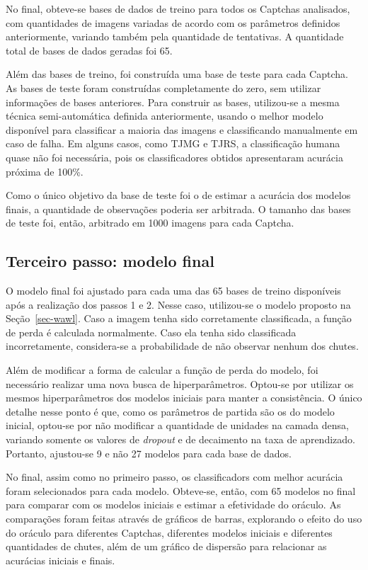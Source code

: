 \documentclass[12pt,twoside,brazilian]{book}
\begin{document}
No final, obteve-se bases de dados de treino para todos os Captchas
analisados, com quantidades de imagens variadas de acordo com os
parâmetros definidos anteriormente, variando também pela quantidade de
tentativas. A quantidade total de bases de dados geradas foi 65.

Além das bases de treino, foi construída uma base de teste para cada
Captcha. As bases de teste foram construídas completamente do zero, sem
utilizar informações de bases anteriores. Para construir as bases,
utilizou-se a mesma técnica semi-automática definida anteriormente,
usando o melhor modelo disponível para classificar a maioria das imagens
e classificando manualmente em caso de falha. Em alguns casos, como TJMG
e TJRS, a classificação humana quase não foi necessária, pois os
classificadores obtidos apresentaram acurácia próxima de 100\%.

Como o único objetivo da base de teste foi o de estimar a acurácia dos
modelos finais, a quantidade de observações poderia ser arbitrada. O
tamanho das bases de teste foi, então, arbitrado em 1000 imagens para
cada Captcha.

\hypertarget{terceiro-passo-modelo-final}{%
\subsection{Terceiro passo: modelo
final}\label{terceiro-passo-modelo-final}}

O modelo final foi ajustado para cada uma das 65 bases de treino
disponíveis após a realização dos passos 1 e 2. Nesse caso, utilizou-se
o modelo proposto na Seção~\ref{sec-wawl}. Caso a imagem tenha sido
corretamente classificada, a função de perda é calculada normalmente.
Caso ela tenha sido classificada incorretamente, considera-se a
probabilidade de não observar nenhum dos chutes.

Além de modificar a forma de calcular a função de perda do modelo, foi
necessário realizar uma nova busca de hiperparâmetros. Optou-se por
utilizar os mesmos hiperparâmetros dos modelos iniciais para manter a
consistência. O único detalhe nesse ponto é que, como os parâmetros de
partida são os do modelo inicial, optou-se por não modificar a
quantidade de unidades na camada densa, variando somente os valores de
\emph{dropout} e de decaimento na taxa de aprendizado. Portanto,
ajustou-se 9 e não 27 modelos para cada base de dados.

No final, assim como no primeiro passo, os classificadors com melhor
acurácia foram selecionados para cada modelo. Obteve-se, então, com 65
modelos no final para comparar com os modelos iniciais e estimar a
efetividade do oráculo. As comparações foram feitas através de gráficos
de barras, explorando o efeito do uso do oráculo para diferentes
Captchas, diferentes modelos iniciais e diferentes quantidades de
chutes, além de um gráfico de dispersão para relacionar as acurácias
iniciais e finais.
\end{document}
